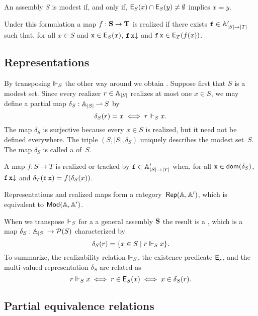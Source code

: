 An assembly $S$ is modest if, and only if, $\mathsf{E}_S(x) \cap \mathsf{E}_S(y) \neq \emptyset$ implies $x = y$.

Under this formulation a map $f : \mathbf{S} \to \mathbf{T}$ is realized if there exists $\mathtt{f} \in \mathbb{A}'_{|S| \to |T|}$ such that, for all $x \in S$ and $\mathtt{x} \in \mathsf{E}_S(x)$, $\mathtt{f}\,\mathtt{x}{\downarrow}$ and $\mathtt{f}\,\mathtt{x} \in \mathsf{E}_T(f(x))$.

\subsection{Representations}
\label{sec:representations}

By transposing $\Vdash_S$ the other way around we obtain . Suppose first that $S$ is a modest set. Since every realizer $r \in \mathbb{A}_{|S|}$ realizes at most one $x \in S$, we may define a partial map $\delta_S : \mathbb{A}_{|S|} \mathbin{\rightharpoonup} S$ by
%
\begin{equation*}
  \delta_S(r) = x \iff r \Vdash_S x.
\end{equation*}
%
The map $\delta_S$ is surjective because every $x \in S$ is realized, but it need not be defined everywhere. The triple $(S, |S|, \delta_S)$ uniquely describes the modest set~$S$. The map $\delta_S$ is called a  of~$S$.

A map $f : S \to T$ is realized or tracked by $\mathtt{f} \in \mathbb{A}'_{|S| \to |T|}$ when, for all $\mathtt{x} \in \mathsf{dom}(\delta_S)$, $\mathtt{f}\,\mathtt{x}{\downarrow}$ and $\delta_T(\mathtt{f}\,\mathtt{x}) = f(\delta_S(x))$.

Representations and realized maps form a category~$\mathsf{Rep}(\mathbb{A},\mathbb{A}')$, which is equivalent to $\mathsf{Mod}(\mathbb{A}, \mathbb{A}')$.

When we transpose $\Vdash_S$ for a a general assembly $\mathbf{S}$ the result is a , which is a map $\delta_S : \mathbb{A}_{|S|} \to \mathcal{P}(S)$ characterized by
%
\begin{equation*}
  \delta_S(r) = \{ x \in S \mid r \Vdash_S x\}.
\end{equation*}
%
To summarize, the realizability relation $\Vdash_S$, the existence predicate $\mathsf{E}_s$, and the multi-valued representation $\delta_S$ are related as
%
\begin{equation*}
  r \Vdash_S x \iff
  r \in \mathsf{E}_S(x) \iff
  x \in \delta_S(r).
\end{equation*}


\subsection{Partial equivalence relations}
\label{sec:pers}

